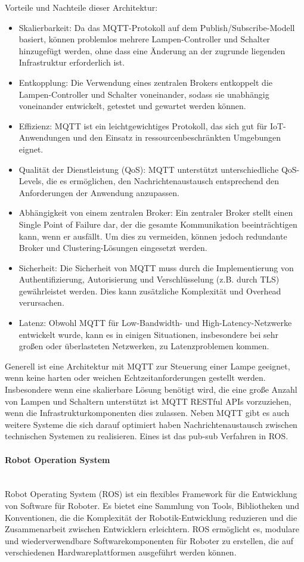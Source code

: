 \documentclass[../vs-script-first-v01.tex]{subfiles}
\begin{document}
Vorteile und Nachteile dieser Architektur: 
\begin{itemize}
\item Skalierbarkeit: Da das MQTT-Protokoll auf dem Publish/Subscribe-Modell basiert, können problemlos mehrere Lampen-Controller und Schalter hinzugefügt werden, ohne dass eine Änderung an der zugrunde liegenden Infrastruktur erforderlich ist.
\item Entkopplung: Die Verwendung eines zentralen Brokers entkoppelt die Lampen-Controller und Schalter voneinander, sodass sie unabhängig voneinander entwickelt, getestet und gewartet werden können.
\item Effizienz: MQTT ist ein leichtgewichtiges Protokoll, das sich gut für IoT-Anwendungen und den Einsatz in ressourcenbeschränkten Umgebungen eignet.
\item Qualität der Dienstleistung (QoS): MQTT unterstützt unterschiedliche QoS-Levels, die es ermöglichen, den Nachrichtenaustausch entsprechend den Anforderungen der Anwendung anzupassen.
\item Abhängigkeit von einem zentralen Broker: Ein zentraler Broker stellt einen Single Point of Failure dar, der die gesamte Kommunikation beeinträchtigen kann, wenn er ausfällt. Um dies zu vermeiden, können jedoch redundante Broker und Clustering-Lösungen eingesetzt werden.
\item Sicherheit: Die Sicherheit von MQTT muss durch die Implementierung von Authentifizierung, Autorisierung und Verschlüsselung (z.B. durch TLS) gewährleistet werden. Dies kann zusätzliche Komplexität und Overhead verursachen.
\item Latenz: Obwohl MQTT für Low-Bandwidth- und High-Latency-Netzwerke entwickelt wurde, kann es in einigen Situationen, insbesondere bei sehr großen oder überlasteten Netzwerken, zu Latenzproblemen kommen.
\end{itemize}

Generell ist eine Architektur mit MQTT zur Steuerung einer Lampe geeignet, wenn keine harten oder weichen Echtzeitanforderungen gestellt werden. Insbesondere wenn eine skalierbare Lösung benötigt wird, die eine große Anzahl von Lampen und Schaltern unterstützt ist MQTT RESTful APIs vorzuziehen, wenn die Infrastrukturkomponenten dies zulassen. 
Neben MQTT gibt es auch weitere Systeme die sich darauf optimiert haben Nachrichtenaustausch zwischen technischen Systemen zu realisieren. Eines ist das pub-sub Verfahren in ROS. 
\paragraph{Robot Operation System\\\\}
Robot Operating System (ROS) ist ein flexibles Framework für die Entwicklung von Software für Roboter. Es bietet eine Sammlung von Tools, Bibliotheken und Konventionen, die die Komplexität der Robotik-Entwicklung reduzieren und die Zusammenarbeit zwischen Entwicklern erleichtern. ROS ermöglicht es, modulare und wiederverwendbare Softwarekomponenten für Roboter zu erstellen, die auf verschiedenen Hardwareplattformen ausgeführt werden können.
\end{document}
